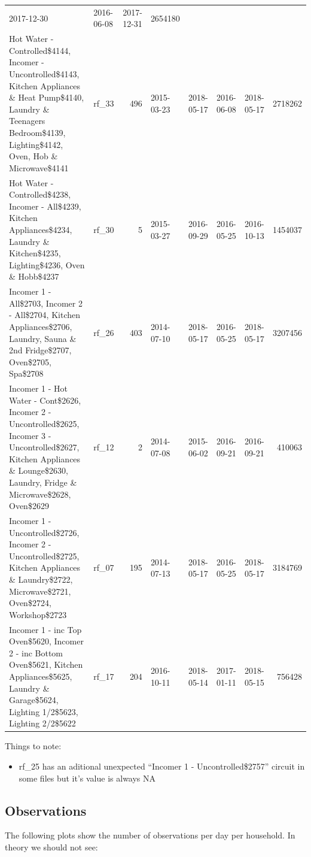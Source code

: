 \documentclass[]{article}
\providecommand{\tightlist}{%
  \setlength{\itemsep}{0pt}\setlength{\parskip}{0pt}}
\begin{document}
\begin{longtable}[]{@{}llrllllr@{}}
2017-12-30 & 2016-06-08 & 2017-12-31 & 2654180\tabularnewline
Hot Water - Controlled\$4144, Incomer - Uncontrolled\$4143, Kitchen
Appliances \& Heat Pump\$4140, Laundry \& Teenagers Bedroom\$4139,
Lighting\$4142, Oven, Hob \& Microwave\$4141 & rf\_33 & 496 & 2015-03-23
& 2018-05-17 & 2016-06-08 & 2018-05-17 & 2718262\tabularnewline
Hot Water - Controlled\$4238, Incomer - All\$4239, Kitchen
Appliances\$4234, Laundry \& Kitchen\$4235, Lighting\$4236, Oven \&
Hobb\$4237 & rf\_30 & 5 & 2015-03-27 & 2016-09-29 & 2016-05-25 &
2016-10-13 & 1454037\tabularnewline
Incomer 1 - All\$2703, Incomer 2 - All\$2704, Kitchen Appliances\$2706,
Laundry, Sauna \& 2nd Fridge\$2707, Oven\$2705, Spa\$2708 & rf\_26 & 403
& 2014-07-10 & 2018-05-17 & 2016-05-25 & 2018-05-17 &
3207456\tabularnewline
Incomer 1 - Hot Water - Cont\$2626, Incomer 2 - Uncontrolled\$2625,
Incomer 3 - Uncontrolled\$2627, Kitchen Appliances \& Lounge\$2630,
Laundry, Fridge \& Microwave\$2628, Oven\$2629 & rf\_12 & 2 & 2014-07-08
& 2015-06-02 & 2016-09-21 & 2016-09-21 & 410063\tabularnewline
Incomer 1 - Uncontrolled\$2726, Incomer 2 - Uncontrolled\$2725, Kitchen
Appliances \& Laundry\$2722, Microwave\$2721, Oven\$2724, Workshop\$2723
& rf\_07 & 195 & 2014-07-13 & 2018-05-17 & 2016-05-25 & 2018-05-17 &
3184769\tabularnewline
Incomer 1 - inc Top Oven\$5620, Incomer 2 - inc Bottom Oven\$5621,
Kitchen Appliances\$5625, Laundry \& Garage\$5624, Lighting 1/2\$5623,
Lighting 2/2\$5622 & rf\_17 & 204 & 2016-10-11 & 2018-05-14 & 2017-01-11
& 2018-05-15 & 756428\tabularnewline
\bottomrule
\end{longtable}

Things to note:

\begin{itemize}
\tightlist
\item
  rf\_25 has an aditional unexpected ``Incomer 1 - Uncontrolled\$2757''
  circuit in some files but it's value is always NA
\end{itemize}

\subsection{Observations}\label{observations}

The following plots show the number of observations per day per
household. In theory we should not see:
\end{document}
